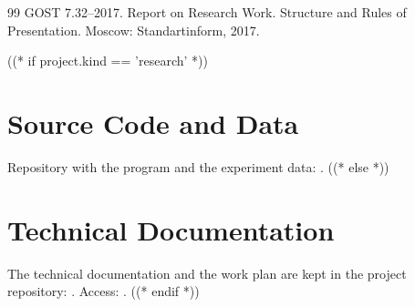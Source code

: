 \documentclass[12pt,a4paper]{extreport}
\begin{document}
\clearpage
{}
{}
\begin{thebibliography}{99}
  GOST 7.32--2017. Report on Research Work. Structure and Rules of Presentation. Moscow: Standartinform, 2017.
\end{thebibliography}

\clearpage
\appendix
{}
((* if project.kind == 'research' *))
\chapter{Source Code and Data}
Repository with the program and the experiment data: .
((* else *))
\chapter{Technical Documentation}
The technical documentation and the work plan are kept in the project
repository: . Access: .
((* endif *))
\end{document}
